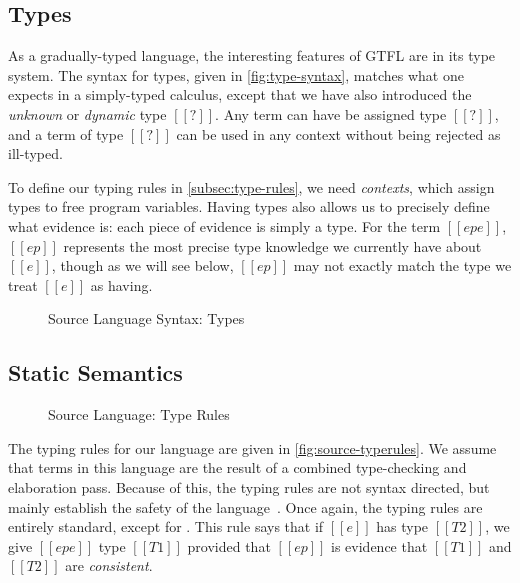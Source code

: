 \documentclass[11pt]{article}
\newcommand{\rrule}[1]{\rref*{#1}}
\begin{document}
\subsection{Types}
\label{subsec:source-types}

As a gradually-typed language, the interesting features of GTFL are in its type system.
The syntax for types, given in \autoref{fig:type-syntax}, matches what one expects in a simply-typed calculus, except that
we have also introduced the \textit{unknown} or \textit{dynamic} type $[[?]]$.
Any term can have be assigned type $[[?]]$, and a term of type $[[?]]$ can be used in
any context without being rejected as ill-typed.

To define our typing rules in \autoref{subsec:type-rules}, we need \textit{contexts}, which
assign types to free program variables. Having types also allows us to precisely define what evidence is:
each piece of evidence is simply a type. For the term $[[ep e]]$, $[[ep]]$ represents the most precise
type knowledge we currently have about $[[e]]$, though as we will see below,
$[[ep]]$ may not exactly match the type we treat $[[e]]$ as having.  


\begin{figure}[H] 


	\caption{Source Language Syntax: Types}
	\label{fig:type-syntax} 
\end{figure}

\subsection{Static Semantics}
\label{subsec:type-rules}

\begin{figure}[H]
	\ottdefnHastype{}
	\caption{Source Language: Type Rules}
	\label{fig:source-typerules}
\end{figure}

The typing rules for our language are given in \autoref{fig:source-typerules}.
We assume that terms in this language are the result of a combined type-checking
and elaboration pass. Because of this, the typing rules are not syntax directed,
but mainly establish the safety of the language~\citep{agt}.
Once again, the typing rules are entirely standard, except for \rrule{HastypeAscr}.
This rule says that if $[[e]]$ has type $[[T2]]$, we give $[[ep e]]$ type $[[T1]]$
provided that $[[ep]]$ is evidence that $[[T1]]$ and $[[T2]]$ are \textit{consistent}.
\end{document}
